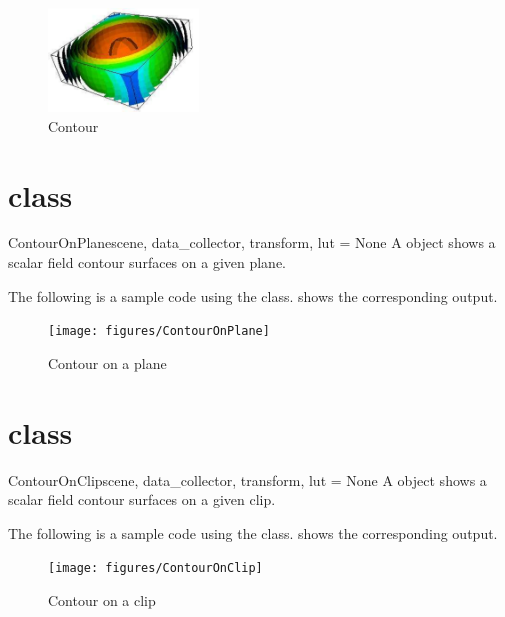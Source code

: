 \begin{figure}[ht]
\begin{center}
\includegraphics[width=40mm]{figures/Contour}
\end{center}
\caption{Contour}
\label{fig:contour.1}
\end{figure}

\section{\ContourOnPlane class}
\begin{classdesc}{ContourOnPlane}{scene, data_collector, transform, lut = None}
A \ContourOnPlane object shows a scalar field contour surfaces on a given plane.
\end{classdesc}

The following is a sample code using the \ContourOnPlane class.
 shows the corresponding output.


\begin{figure}[ht]
\begin{center}
\texttt{[image: figures/ContourOnPlane]}
\end{center}
\caption{Contour on a plane}
\label{fig:contouronplane.1}
\end{figure}

\section{\ContourOnClip class}
\begin{classdesc}{ContourOnClip}{scene, data_collector, transform, lut = None}
A \ContourOnClip object shows a scalar field contour surfaces on a given clip.
\end{classdesc}

The following is a sample code using the \ContourOnClip class.
 shows the corresponding output.


\begin{figure}[ht]
\begin{center}
\texttt{[image: figures/ContourOnClip]}
\end{center}
\caption{Contour on a clip}
\label{fig:contouronclip.1}
\end{figure}

